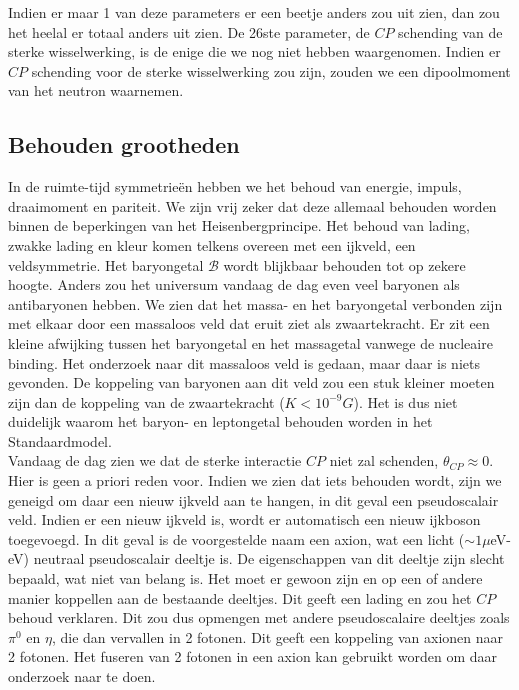 \documentclass[../main.tex]{subfiles}
\begin{document}
Indien er maar 1 van deze parameters er een beetje anders zou uit zien, dan zou het heelal er totaal anders uit zien. De 26ste parameter, de $CP$ schending van de sterke wisselwerking, is de enige die we nog niet hebben waargenomen. Indien er $CP$ schending voor de sterke wisselwerking zou zijn, zouden we een dipoolmoment van het neutron waarnemen.

\subsection{Behouden grootheden}%
\label{sub:behouden_grootheden}

In de ruimte-tijd symmetrieën hebben we het behoud van energie, impuls, draaimoment en pariteit. We zijn vrij zeker dat deze allemaal behouden worden binnen de beperkingen van het Heisenbergprincipe. Het behoud van lading, zwakke lading en kleur komen telkens overeen met een ijkveld, een veldsymmetrie. Het baryongetal $\mathcal{B}$ wordt blijkbaar behouden tot op zekere hoogte. Anders zou het universum vandaag de dag even veel baryonen als antibaryonen hebben. We zien dat het massa- en het baryongetal verbonden zijn met elkaar door een massaloos veld dat eruit ziet als zwaartekracht. Er zit een kleine afwijking tussen het baryongetal en het massagetal vanwege de nucleaire binding. Het onderzoek naar dit massaloos veld is gedaan, maar daar is niets gevonden. De koppeling van baryonen aan dit veld zou een stuk kleiner moeten zijn dan de koppeling van de zwaartekracht ($K<10^{-9}G$). Het is dus niet duidelijk waarom het baryon- en leptongetal behouden worden in het Standaardmodel.\\
Vandaag de dag zien we dat de sterke interactie $CP$ niet zal schenden, $\theta_{C P} \approx 0$. Hier is geen a priori reden voor. Indien we zien dat iets behouden wordt, zijn we geneigd om daar een nieuw ijkveld aan te hangen, in dit geval een pseudoscalair veld. Indien er een nieuw ijkveld is, wordt er automatisch een nieuw ijkboson toegevoegd. In dit geval is de voorgestelde naam een axion, wat een licht ($\sim 1\mu$eV-eV) neutraal pseudoscalair deeltje is. De eigenschappen van dit deeltje zijn slecht bepaald, wat niet van belang is. Het moet er gewoon zijn en op een of andere manier koppellen aan de bestaande deeltjes. Dit geeft een lading en zou het $CP$ behoud verklaren. Dit zou dus opmengen met andere pseudoscalaire deeltjes zoals $\pi^0$ en $\eta$, die dan vervallen in 2 fotonen. Dit geeft een koppeling van axionen naar 2 fotonen. Het fuseren van 2 fotonen in een axion kan gebruikt worden om daar onderzoek naar te doen.
\end{document}
